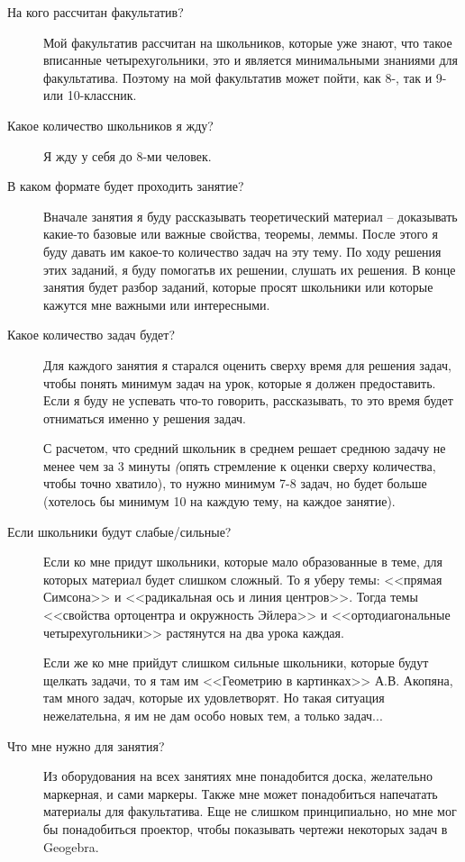 \begin{description}
    \item[На кого рассчитан факультатив?] Мой факультатив рассчитан на школьников, которые уже знают, что такое вписанные четырехугольники, это и является минимальными знаниями для факультатива. Поэтому на мой факультатив может пойти, как 8-, так и 9- или 10-классник.

    \item[Какое количество школьников я жду?] Я жду у себя до 8-ми человек.

    \item[В каком формате будет проходить занятие?] Вначале занятия я буду рассказывать теоретический материал -- доказывать какие-то базовые или важные свойства, теоремы, леммы. После этого я буду давать им какое-то количество задач на эту тему. По ходу решения этих заданий, я буду помогатьв их решении, слушать их решения. В конце занятия будет разбор заданий, которые просят школьники или которые кажутся мне важными или интересными.

    \item[Какое количество задач будет?] Для каждого занятия я старался оценить сверху время для решения задач, чтобы понять минимум задач на урок, которые я должен предоставить. Если я буду не успевать что-то говорить, рассказывать, то это время будет отниматься именно у решения задач.

    С расчетом, что средний школьник в среднем решает среднюю задачу не менее чем за 3 минуты \textit(опять стремление к оценки сверху количества, чтобы точно хватило), то нужно минимум 7-8 задач, но будет больше (хотелось бы минимум 10 на каждую тему, на каждое занятие).
    
    \item[Если школьники будут слабые/сильные?] Если ко мне придут школьники, которые мало образованные в теме, для которых материал будет слишком сложный. То я уберу темы: <<прямая Симсона>> и <<радикальная ось и линия центров>>. Тогда темы <<свойства ортоцентра и окружность Эйлера>> и <<ортодиагональные четырехугольники>> растянутся на два урока каждая. 
    
    Если же ко мне прийдут слишком сильные школьники, которые будут щелкать задачи, то я там им <<Геометрию в картинках>> А.В. Акопяна, там много задач, которые их удовлетворят. Но такая ситуация нежелательна, я им не дам особо новых тем, а только задач...

    \item[Что мне нужно для занятия?] Из оборудования на всех занятиях мне понадобится доска, желательно маркерная, и сами маркеры. Также мне может понадобиться напечатать материалы для факультатива. Еще не слишком принципиально, но мне мог бы понадобиться проектор, чтобы показывать чертежи некоторых задач в Geogebra.


\end{description}
